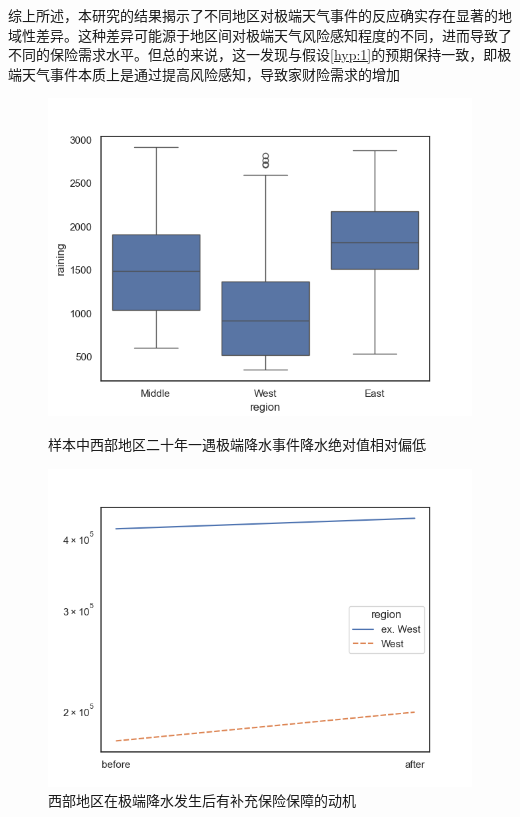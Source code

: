 综上所述，本研究的结果揭示了不同地区对极端天气事件的反应确实存在显著的地域性差异。这种差异可能源于地区间对极端天气风险感知程度的不同，进而导致了不同的保险需求水平。但总的来说，这一发现与假设\ref{hyp:1}的预期保持一致，即极端天气事件本质上是通过提高风险感知，导致家财险需求的增加

\begin{figure}[htbp]
    \centering
    \begin{minipage}{0.48\linewidth}
        \includegraphics[width=\linewidth]{lib/img/rainings.png}
        \caption{样本中西部地区二十年一遇极端降水事件降水绝对值相对偏低}\label{fig:rainings}
    \end{minipage}
    \begin{minipage}{0.48\linewidth}
        \includegraphics[width=\linewidth]{lib/img/covbyregion.png}
        \caption{西部地区在极端降水发生后有补充保险保障的动机}
    \end{minipage}
\end{figure}

